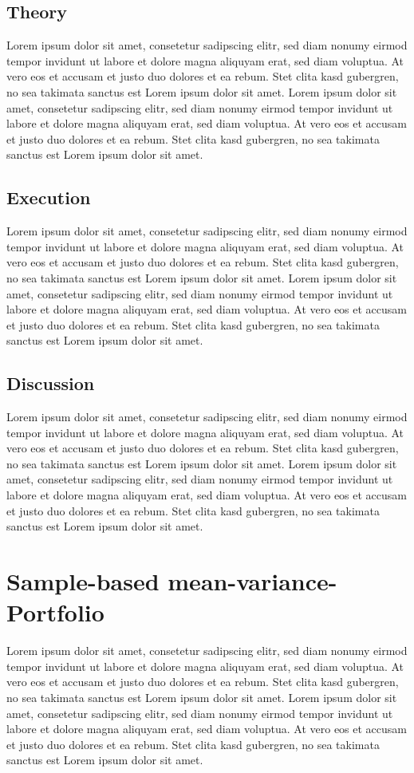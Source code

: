 \subsection{Theory}
Lorem ipsum dolor sit amet, consetetur sadipscing elitr, sed diam nonumy eirmod tempor invidunt ut labore et dolore magna aliquyam erat, sed diam voluptua. At vero eos et accusam et justo duo dolores et ea rebum. Stet clita kasd gubergren, no sea takimata sanctus est Lorem ipsum dolor sit amet. Lorem ipsum dolor sit amet, consetetur sadipscing elitr, sed diam nonumy eirmod tempor invidunt ut labore et dolore magna aliquyam erat, sed diam voluptua. At vero eos et accusam et justo duo dolores et ea rebum. Stet clita kasd gubergren, no sea takimata sanctus est Lorem ipsum dolor sit amet.
\subsection{Execution}
Lorem ipsum dolor sit amet, consetetur sadipscing elitr, sed diam nonumy eirmod tempor invidunt ut labore et dolore magna aliquyam erat, sed diam voluptua. At vero eos et accusam et justo duo dolores et ea rebum. Stet clita kasd gubergren, no sea takimata sanctus est Lorem ipsum dolor sit amet. Lorem ipsum dolor sit amet, consetetur sadipscing elitr, sed diam nonumy eirmod tempor invidunt ut labore et dolore magna aliquyam erat, sed diam voluptua. At vero eos et accusam et justo duo dolores et ea rebum. Stet clita kasd gubergren, no sea takimata sanctus est Lorem ipsum dolor sit amet.
\subsection{Discussion}
Lorem ipsum dolor sit amet, consetetur sadipscing elitr, sed diam nonumy eirmod tempor invidunt ut labore et dolore magna aliquyam erat, sed diam voluptua. At vero eos et accusam et justo duo dolores et ea rebum. Stet clita kasd gubergren, no sea takimata sanctus est Lorem ipsum dolor sit amet. Lorem ipsum dolor sit amet, consetetur sadipscing elitr, sed diam nonumy eirmod tempor invidunt ut labore et dolore magna aliquyam erat, sed diam voluptua. At vero eos et accusam et justo duo dolores et ea rebum. Stet clita kasd gubergren, no sea takimata sanctus est Lorem ipsum dolor sit amet.

\section{Sample-based mean-variance-Portfolio}
Lorem ipsum dolor sit amet, consetetur sadipscing elitr, sed diam nonumy eirmod tempor invidunt ut labore et dolore magna aliquyam erat, sed diam voluptua. At vero eos et accusam et justo duo dolores et ea rebum. Stet clita kasd gubergren, no sea takimata sanctus est Lorem ipsum dolor sit amet. Lorem ipsum dolor sit amet, consetetur sadipscing elitr, sed diam nonumy eirmod tempor invidunt ut labore et dolore magna aliquyam erat, sed diam voluptua. At vero eos et accusam et justo duo dolores et ea rebum. Stet clita kasd gubergren, no sea takimata sanctus est Lorem ipsum dolor sit amet.
